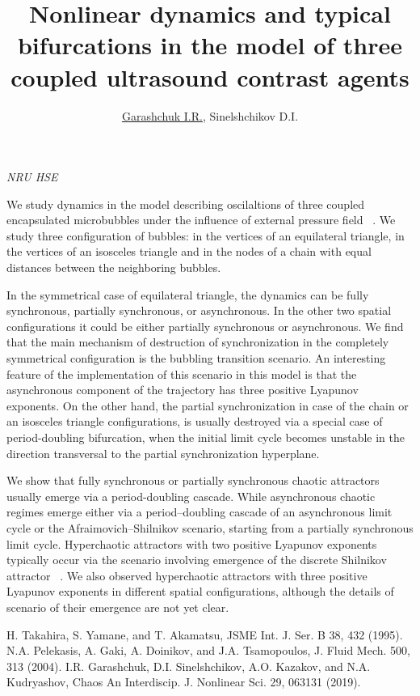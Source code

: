 \documentclass[12pt]{article}
\title{\bf\Large Nonlinear dynamics and typical bifurcations in the model of three coupled ultrasound contrast agents}
\author{\underline{Garashchuk I.R.}, Sinelshchikov D.I.}
\date{}
\begin{document}
\begin{center}
	\maketitle
	{\large\textit{NRU HSE}}
\end{center}

We study dynamics in the model describing oscilaltions of three coupled encapsulated microbubbles under the influence of external pressure field ~\cite{Takahira1995, Doinikov2004}. We study three configuration of bubbles: in the vertices of an equilateral triangle, in the vertices of an isosceles triangle and in the nodes of a chain with equal distances between the neighboring bubbles.

In the symmetrical case of equilateral triangle, the dynamics can be fully synchronous, partially synchronous, or asynchronous. In the other two spatial configurations it could be either partially synchronous or asynchronous. We find that the main mechanism of destruction of synchronization in the completely symmetrical configuration is the bubbling transition scenario. An interesting feature of the implementation of this scenario in this model is that the asynchronous component of the trajectory has three positive Lyapunov exponents.
On the other hand, the partial synchronization in case of the chain or an isosceles triangle configurations, is usually destroyed via a special case of period-doubling bifurcation, when the initial limit cycle becomes unstable in the direction transversal to the partial synchronization hyperplane.

We show that fully synchronous or partially synchronous chaotic attractors usually emerge via a period-doubling cascade. While asynchronous chaotic regimes emerge either via a period--doubling cascade of an asynchronous limit cycle or the Afraimovich--Shilnikov scenario, starting from a partially synchronous limit cycle. Hyperchaotic attractors with two positive Lyapunov exponents typically occur via the scenario involving emergence of the discrete Shilnikov attractor ~\cite{Garashchuk2019}. We also observed hyperchaotic attractors with three positive Lyapunov exponents in different spatial configurations, although the details of scenario of their emergence are not yet clear.




\begin{thebibliography}{99}
 H. Takahira, S. Yamane, and T. Akamatsu, JSME Int. J. Ser. B 38, 432 (1995).
 N.A. Pelekasis, A. Gaki, A. Doinikov, and J.A. Tsamopoulos, J. Fluid Mech. 500, 313 (2004).
 I.R. Garashchuk, D.I. Sinelshchikov, A.O. Kazakov, and N.A. Kudryashov, Chaos An Interdiscip. J. Nonlinear Sci. 29, 063131 (2019).
\end{thebibliography}
\end{document}
